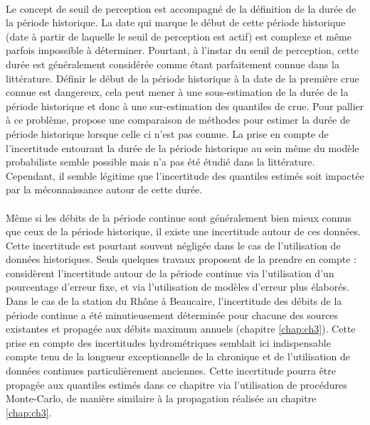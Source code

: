	\paragraph{} Le concept de seuil de perception est accompagné de la définition de la durée de la période historique. La date qui marque le début de cette période historique (date à partir de laquelle le seuil de perception est actif) est complexe et même parfois impossible à déterminer. Pourtant, à l'instar du seuil de perception, cette durée est généralement considérée comme étant parfaitement connue dans la littérature. Définir le début de la période historique à la date de la première crue connue est dangereux, cela peut mener à une sous-estimation de la durée de la période historique et donc à une sur-estimation des quantiles de crue. Pour pallier à ce problème, \citet{prosdocimi_german_2018} propose une comparaison de méthodes pour estimer la durée de période historique lorsque celle ci n'est pas connue. La prise en compte de l'incertitude entourant la durée de la période historique au sein même du modèle probabiliste semble possible mais n'a pas été étudié dans la littérature. Cependant, il semble légitime que l'incertitude des quantiles estimés soit impactée par la méconnaissance autour de cette durée. 
	
	\paragraph{} Même si les débits de la période continue sont généralement bien mieux connus que ceux de la période historique, il existe une incertitude autour de ces données. Cette incertitude est pourtant souvent négligée dans le cas de l'utilisation de données historiques. Seuls quelques travaux proposent de la prendre en compte : \citet{parkes_defining_2016} considèrent l'incertitude autour de la période continue via l'utilisation d'un pourcentage d'erreur fixe, et \citet{neppel_flood_2010} via l'utilisation de modèles d'erreur plus élaborés. Dans le cas de la station du Rhône à Beaucaire, l'incertitude des débits de la période continue a été minutieusement déterminée pour chacune des sources existantes et propagée aux débits maximum annuels (chapitre \ref{chap:ch3}). Cette prise en compte des incertitudes hydrométriques semblait ici indispensable compte tenu de la longueur exceptionnelle de la chronique et de l'utilisation de données continues particulièrement anciennes. Cette incertitude pourra être propagée aux quantiles estimés dans ce chapitre via l'utilisation de procédures Monte-Carlo, de manière similaire à la propagation réalisée au chapitre \ref{chap:ch3}.
	
